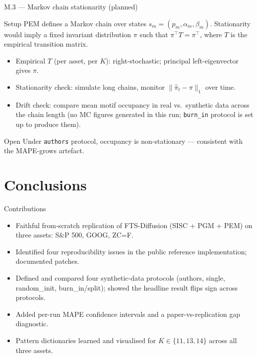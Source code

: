 \documentclass[11pt,aspectratio=169]{beamer}
\begin{document}
\begin{frame}{M.3 --- Markov chain stationarity (planned)}
  \begin{block}{Setup}
    PEM defines a Markov chain over states $s_m=(p_m,\alpha_m,\beta_m)$.
    Stationarity would imply a fixed invariant distribution $\pi$ such that
    $\pi^\top T = \pi^\top$, where $T$ is the empirical transition matrix.
  \end{block}
  \begin{itemize}
    \item Empirical $T$ (per asset, per $K$): right-stochastic; principal left-eigenvector gives $\pi$.
    \item \alert{Stationarity check:} simulate long chains, monitor $\|\hat\pi_t-\pi\|_1$ over time.
    \item \alert{Drift check:} compare mean motif occupancy in real vs.\ synthetic data across the chain length (no MC figures generated in this run; \texttt{burn\_in} protocol is set up to produce them).
  \end{itemize}
  \begin{alertblock}{Open}
    Under \texttt{authors} protocol, occupancy is non-stationary --- consistent with the MAPE-grows artefact.
  \end{alertblock}
\end{frame}

\section{Conclusions}

\begin{frame}{Contributions}
  \begin{itemize}\setlength\itemsep{4pt}
    \item Faithful from-scratch replication of FTS-Diffusion (SISC + PGM + PEM) on \alert{three assets}: S\&P 500, GOOG, ZC=F.
    \item Identified four reproducibility issues in the public reference implementation; documented patches.
    \item Defined and compared \alert{four synthetic-data protocols} (authors, single, random\_init, burn\_in/split); showed the headline result flips sign across protocols.
    \item Added per-run MAPE confidence intervals and a paper-vs-replication gap diagnostic.
    \item Pattern dictionaries learned and visualised for $K\!\in\!\{11,13,14\}$ across all three assets.
  \end{itemize}
\end{frame}
\end{document}
